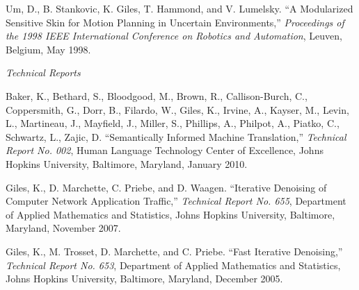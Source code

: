 \documentclass[11pt,article,oneside]{memoir}
\begin{document}
\ind Um, D., B. Stankovic, K. Giles, T. Hammond, and V. Lumelsky. “A Modularized Sensitive Skin for Motion Planning in Uncertain Environments,” \emph{Proceedings of the 1998 IEEE International Conference on Robotics and Automation}, Leuven, Belgium, May 1998.



\bigskip

\noindent\emph{Technical Reports \vspace{0.05in}}

 

\ind Baker, K., Bethard, S., Bloodgood, M., Brown, R., Callison-Burch, C., Coppersmith, G., Dorr, B., Filardo, W., Giles, K., Irvine, A., Kayser, M., Levin, L., Martineau, J., Mayfield, J., Miller, S., Phillips, A., Philpot, A., Piatko, C., Schwartz, L., Zajic, D. “Semantically Informed Machine Translation,” \emph{Technical Report No. 002}, Human Language Technology Center of Excellence, Johns Hopkins University, Baltimore, Maryland, January 2010.

\ind Giles, K., D. Marchette, C. Priebe, and D. Waagen. “Iterative Denoising of Computer Network Application Traffic,” \emph{Technical Report No. 655}, Department of Applied Mathematics and Statistics, Johns Hopkins University, Baltimore, Maryland, November 2007.

\ind Giles, K., M. Trosset, D. Marchette, and C. Priebe. “Fast Iterative Denoising,” \emph{Technical Report No. 653}, Department of Applied Mathematics and Statistics, Johns Hopkins University, Baltimore, Maryland, December 2005.







\end{document}
